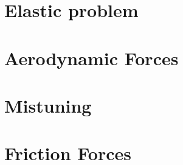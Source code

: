 

\section{Elastic problem}


\section{Aerodynamic Forces}


\section{Mistuning}


\section{Friction Forces}




